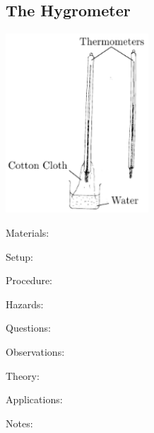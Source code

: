 \begin{multicols}{2}
\subsection{The Hygrometer}

\begin{center}
\includegraphics[width=0.4\textwidth]{./img/hygrometer.png}
\end{center}

\begin{description*}
\item[Materials:]{}
\item[Setup:]{}
\item[Procedure:]{}
\item[Hazards:]{}
\item[Questions:]{}
\item[Observations:]{}
\item[Theory:]{}
\item[Applications:]{}
\item[Notes:]{}
\end{description*}



\end{multicols}

\pagebreak